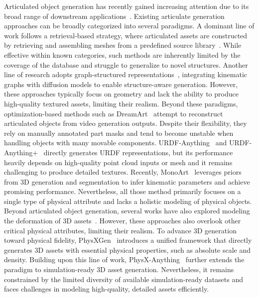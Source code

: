 \documentclass[11pt]{article}
\begin{document}
Articulated object generation has recently gained increasing attention due to its broad range of downstream applications~\cite{li2026monoart,qiu2025articulate,song2025magicarticulate,su2025artformer,chen2025artilatent,chen2025freeart3d,joshi2505procedural}. Existing articulate generation approaches can be broadly categorized into several paradigms. A dominant line of work follows a retrieval-based strategy, where articulated assets are constructed by retrieving and assembling meshes from a predefined source library~\cite{chen2024urdformer,le2024articulate}. While effective within known categories, such methods are inherently limited by the coverage of the database and struggle to generalize to novel structures. Another line of research adopts graph-structured representations~\cite{liu2024singapo,lei2023nap}, integrating kinematic graphs with diffusion models to enable structure-aware generation. However, these approaches typically focus on geometry and lack the ability to produce high-quality textured assets, limiting their realism. Beyond these paradigms, optimization-based methods such as DreamArt~\cite{lu2025dreamart} attempt to reconstruct articulated objects from video generation outputs. Despite their flexibility, they rely on manually annotated part masks and tend to become unstable when handling objects with many movable components. URDF-Anything~\cite{li2025urdf} and URDF-Anything+~\cite{wu2026urdf} directly generates URDF representations, but its performance heavily depends on high-quality point cloud inputs or mesh and it remains challenging to produce detailed textures. Recently, MonoArt~\cite{li2026monoart} leverages priors from 3D generation and segmentation to infer kinematic parameters and achieve promising performance. Nevertheless, all those method primarily focuses on a single type of physical attribute and lacks a holistic modeling of physical objects. Beyond articulated object generation, several works have also explored modeling the deformation of 3D assets~\cite{chen2025physgen3d,le2025pixie,chen2025vid2sim,jiang2025phystwin,cao2025sophy}. However, these approaches also overlook other critical physical attributes, limiting their realism. To advance 3D generation toward physical fidelity, PhysXGen~\cite{cao2025physx} introduces a unified framework that directly generates 3D assets with essential physical properties, such as absolute scale and density. Building upon this line of work, PhysX-Anything~\cite{cao2025physxanything} further extends the paradigm to simulation-ready 3D asset generation. Nevertheless, it remains constrained by the limited diversity of available simulation-ready datasets and faces challenges in modeling high-quality, detailed assets efficiently.
\end{document}
